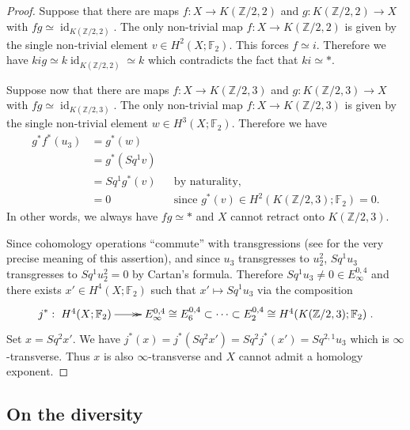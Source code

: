 \documentclass{amsart}
\theoremstyle{definition}
\theoremstyle{remark}
\DeclareMathOperator{\id}{id}
\newcommand{\Z}{\mathbb{Z}}
\newcommand{\F}{\mathbb{F}}
\begin{document}
\begin{proof}
Suppose that there are maps $f:X\to K(\Z/2,2)$ and $g:K(\Z/2,2)\to X$ with $fg\simeq \id_{K(\Z/2,2)}$. The only non-trivial map $f:X\to K(\Z/2,2)$ is given by the single non-trivial element $v\in H^2(X;\F_2)$. This forces $f\simeq i$. Therefore we have $kig\simeq k\id_{K(\Z/2,2)}\simeq k$ which contradicts the fact that $ki\simeq *$.

Suppose now that there are maps $f:X\to K(\Z/2,3)$ and $g:K(\Z/2,3)\to X$ with $fg\simeq \id_{K(\Z/2,3)}$. The only non-trivial map $f:X\to K(\Z/2,3)$ is given by the single non-trivial element $w\in H^3(X;\F_2)$. Therefore we have \begin{align*}
g^*f^*(u_3)&=g^*(w)\\
&=g^*(Sq^1v)\\
&=Sq^1g^*(v) &&\text{by naturality,}\\
&=0 &&\text{since $g^*(v)\in H^2(K(\Z/2,3);\F_2)=0$.}
\end{align*} In other words, we always have $fg\simeq*$ and $X$ cannot retract onto $K(\Z/2,3)$.

%
%

Since cohomology operations ``commute'' with transgressions (see \cite{Si73-I} for the very precise meaning of this assertion), and since $u_3$ transgresses to $u_2^2$, $Sq^1u_3$ transgresses to $Sq^1u_2^2=0$ by Cartan's formula. Therefore $Sq^1u_3\not=0\in E_\infty^{0,4}$ and there exists $x'\in H^4(X;\F_2)$ such that $x'\mapsto Sq^1u_3$ via the composition
$$
j^*:\xymatrix{H^4(X;\F_2)\ar@{->>}[r] &E^{0,4}_\infty\cong E^{0,4}_6\subset\dots\subset E^{0,4}_2\cong H^4(K(\Z/2,3);\F_2)}.
$$ Set $x=Sq^2x'$. We have $j^*(x)=j^*(Sq^2x')=Sq^2j^*(x')=Sq^{2,1}u_3$ which is $\infty$-transverse. Thus $x$ is also $\infty$-transverse and $X$ cannot admit a homology exponent. 
\end{proof}

\subsection{On the diversity}
\end{document}
